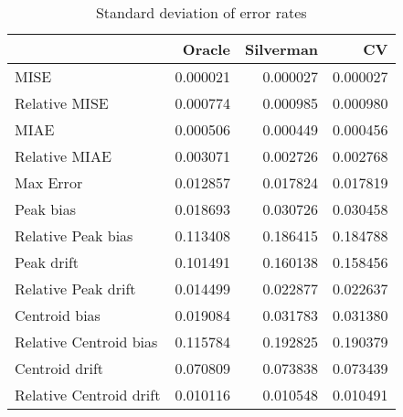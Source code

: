 \begin{table}[ht]
\centering
\begin{tabular}{lrrr}
  \hline
 & Oracle & Silverman & CV \\ 
  \hline
MISE & 0.000021 & 0.000027 & 0.000027 \\ 
  Relative MISE & 0.000774 & 0.000985 & 0.000980 \\ 
  MIAE & 0.000506 & 0.000449 & 0.000456 \\ 
  Relative MIAE & 0.003071 & 0.002726 & 0.002768 \\ 
  Max Error & 0.012857 & 0.017824 & 0.017819 \\ 
  Peak bias & 0.018693 & 0.030726 & 0.030458 \\ 
  Relative Peak bias & 0.113408 & 0.186415 & 0.184788 \\ 
  Peak drift & 0.101491 & 0.160138 & 0.158456 \\ 
  Relative Peak drift & 0.014499 & 0.022877 & 0.022637 \\ 
  Centroid bias & 0.019084 & 0.031783 & 0.031380 \\ 
  Relative Centroid bias & 0.115784 & 0.192825 & 0.190379 \\ 
  Centroid drift & 0.070809 & 0.073838 & 0.073439 \\ 
  Relative Centroid drift & 0.010116 & 0.010548 & 0.010491 \\ 
   \hline
\end{tabular}
\caption{Standard deviation of error rates} 
\label{tbl:stddev_error_rates}
\end{table}
